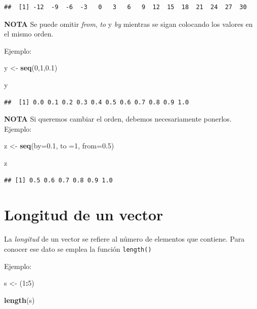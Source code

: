 \documentclass[
]{book}
\newenvironment{Shaded}{\begin{snugshade}}{\end{snugshade}}
\newcommand{\AttributeTok}[1]{\textcolor[rgb]{0.13,0.29,0.53}{#1}}
\newcommand{\DecValTok}[1]{\textcolor[rgb]{0.00,0.00,0.81}{#1}}
\newcommand{\FloatTok}[1]{\textcolor[rgb]{0.00,0.00,0.81}{#1}}
\newcommand{\FunctionTok}[1]{\textcolor[rgb]{0.13,0.29,0.53}{\textbf{#1}}}
\newcommand{\NormalTok}[1]{#1}
\newcommand{\OtherTok}[1]{\textcolor[rgb]{0.56,0.35,0.01}{#1}}
\newcommand{\SpecialCharTok}[1]{\textcolor[rgb]{0.81,0.36,0.00}{\textbf{#1}}}
\begin{document}
\begin{verbatim}
##  [1] -12  -9  -6  -3   0   3   6   9  12  15  18  21  24  27  30
\end{verbatim}

\textbf{NOTA} Se puede omitir \emph{from}, \emph{to} y \emph{by} mientras se sigan colocando los valores en el mismo orden.

Ejemplo:

\begin{Shaded}
\begin{Highlighting}[]
\NormalTok{y }\OtherTok{\textless{}{-}} \FunctionTok{seq}\NormalTok{(}\DecValTok{0}\NormalTok{,}\DecValTok{1}\NormalTok{,}\FloatTok{0.1}\NormalTok{)}

\NormalTok{y}
\end{Highlighting}
\end{Shaded}

\begin{verbatim}
##  [1] 0.0 0.1 0.2 0.3 0.4 0.5 0.6 0.7 0.8 0.9 1.0
\end{verbatim}

\textbf{NOTA} Si queremos cambiar el orden, debemos necesariamente ponerlos.
Ejemplo:

\begin{Shaded}
\begin{Highlighting}[]
\NormalTok{z }\OtherTok{\textless{}{-}} \FunctionTok{seq}\NormalTok{(}\AttributeTok{by=}\FloatTok{0.1}\NormalTok{, }\AttributeTok{to =}\DecValTok{1}\NormalTok{, }\AttributeTok{from=}\FloatTok{0.5}\NormalTok{)}

\NormalTok{z}
\end{Highlighting}
\end{Shaded}

\begin{verbatim}
## [1] 0.5 0.6 0.7 0.8 0.9 1.0
\end{verbatim}

\section{Longitud de un vector}\label{longitud-de-un-vector}

La \emph{longitud} de un vector se refiere al número de elementos que contiene. Para conocer ese dato se emplea la función \texttt{length()}

Ejemplo:

\begin{Shaded}
\begin{Highlighting}[]
\NormalTok{s }\OtherTok{\textless{}{-}}\NormalTok{ (}\DecValTok{1}\SpecialCharTok{:}\DecValTok{5}\NormalTok{)}

\FunctionTok{length}\NormalTok{(s)}
\end{Highlighting}
\end{Shaded}
\end{document}
